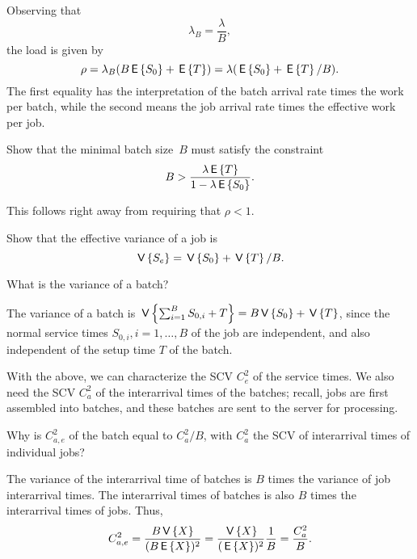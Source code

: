 Observing that
\begin{equation*}
  \lambda_B = \frac \lambda B,
\end{equation*}
the load is given by 
\begin{equation*}
\rho = \lambda_B (B \,\mathsf{E}\left\{S_0\right\} + \,\mathsf{E}\left\{T\right\}) = \lambda (\,\mathsf{E}\left\{S_0\right\} + \,\mathsf{E}\left\{T\right\}/B).
\end{equation*}
The first equality has the interpretation of the batch arrival rate times the work per batch, while the second means the job arrival rate times the effective work per job. 

\begin{exercise} 
Show that  the minimal batch size~$B$ must satisfy the constraint
  \begin{equation*}
 B>\frac{\lambda \,\mathsf{E}\left\{T\right\}}{1-\lambda \,\mathsf{E}\left\{S_0\right\}}.
  \end{equation*}

\begin{solution}
This follows right away from requiring that $\rho < 1$.
\end{solution}
\end{exercise}

\begin{exercise}
Show that the effective variance of a job is  
\begin{equation*}
  \,\mathsf{V}\left\{S_e\right\} = \,\mathsf{V}\left\{S_0\right\} + \,\mathsf{V}\left\{T\right\}/B.
\end{equation*}
\begin{hint}
  What is the variance of a batch?
\end{hint}
\begin{solution}
  The variance of a batch is $\,\mathsf{V}\left\{\sum_{i=1}^B S_{0,i} + T\right\} = B\,\mathsf{V}\left\{S_0\right\} + \,\mathsf{V}\left\{T\right\}$, since the normal service times $S_{0,i}, i=1,\ldots, B$ of the job are independent, and also independent of the setup time $T$  of the batch.
\end{solution}
\end{exercise}

With the above, we can characterize the SCV $C_e^2$ of the service times. We also need the SCV $C_a^2$ of the interarrival times of the batches; recall, jobs are first assembled into batches, and these batches are sent to the server for processing.

\begin{exercise}
  Why is $C_{a,e}^2$ of the batch equal to $C_{a}^2/B$, with $C_a^2$ the SCV of interarrival times of individual jobs?
  \begin{solution}
The variance of the interarrival time of batches is $B$ times the variance of job interarrival times. The interarrival times of batches is also $B$ times the interarrival times of jobs. Thus, 
\begin{equation*}
  C_{a,e}^2 = \frac{B \,\mathsf{V}\left\{X\right\}}{(B \,\mathsf{E}\left\{X\right\})^2} = \frac{\,\mathsf{V}\left\{X\right\}}{(\,\mathsf{E}\left\{X\right\})^2} \frac 1 B =  \frac{C_a^2}{B}.
\end{equation*}
  \end{solution}
\end{exercise}

